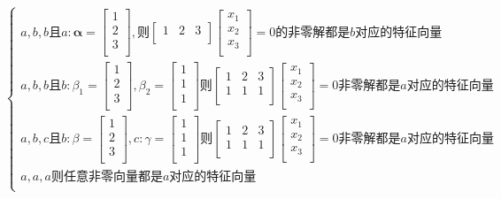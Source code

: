 \documentclass[lang=cn,10pt]{elegantbook}
\begin{document}
$\begin{cases}
	a,b,b\text{且}a:\boldsymbol{\alpha }=\left[ \begin{array}{c}
		1\\
		2\\
		3\\
	\end{array} \right] ,\text{则}\left[ \begin{matrix}
		1&		2&		3\\
	\end{matrix} \right] \left[ \begin{array}{c}
		x_1\\
		x_2\\
		x_3\\
	\end{array} \right] =0\text{的非零解都是}b\text{对应的特征向量}\\
	a,b,b\text{且}b:\beta _1=\left[ \begin{array}{c}
		1\\
		2\\
		3\\
	\end{array} \right] ,\beta _2=\left[ \begin{array}{c}
		1\\
		1\\
		1\\
	\end{array} \right] \text{则}\left[ \begin{matrix}
		1&		2&		3\\
		1&		1&		1\\
	\end{matrix} \right] \left[ \begin{array}{c}
		x_1\\
		x_2\\
		x_3\\
	\end{array} \right] =0\text{非零解都是}a\text{对应的特征向量}\\
	a,b,c\text{且}b:\beta =\left[ \begin{array}{c}
		1\\
		2\\
		3\\
	\end{array} \right] ,c:\gamma =\left[ \begin{array}{c}
		1\\
		1\\
		1\\
	\end{array} \right] \text{则}\left[ \begin{matrix}
		1&		2&		3\\
		1&		1&		1\\
	\end{matrix} \right] \left[ \begin{array}{c}
		x_1\\
		x_2\\
		x_3\\
	\end{array} \right] =0\text{非零解都是}a\text{对应的特征向量}\\
	a,a,a\text{则任意非零向量都是}a\text{对应的特征向量}\\
\end{cases}$
\end{document}
